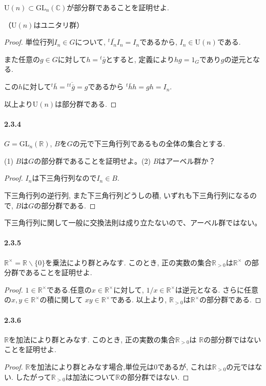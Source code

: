 $\mathrm{U}(n) \subset \mathrm{GL}_n(\mathbb{C})$が部分群であることを証明せよ.

（$ \mathrm{U}(n)$はユニタリ群）
\begin{proof}
  単位行列$I_n \in G$について, ${}^t\bar{I_n}I_n=I_n$であるから,
  $I_n \in \mathrm{U}(n)$である.

  また任意の$g \in G$に対して$h={}^t\bar{g}$とすると,
  定義により$hg=1_G$であり$g$の逆元となる.

  この$h$に対して${}^t \bar{h}={}^t \overline{{}^t\bar{g}}=g$であるから
  ${}^t \bar{h}h=gh= I_n$.
  
  以上より$ \mathrm{U}(n)$は部分群である.
\end{proof}\leavevmode

\paragraph{2.3.4} 
$G=\mathrm{GL}_n(\mathbb{R})$, $B$を$G$の元で下三角行列であるもの全体の集合とする.

(1) $B$は$G$の部分群であることを証明せよ。(2) $B$はアーベル群か？
\begin{proof}
  $I_n$は下三角行列なので$I_n \in B$.
  
  下三角行列の逆行列, また下三角行列どうしの積,
  いずれも下三角行列になるので, $B$は$G$の部分群である.
\end{proof}

下三角行列に関して一般に交換法則は成り立たないので、アーベル群ではない。\newline

\paragraph{2.3.5}
$\mathbb{R}^\times = \mathbb{R}\backslash\{0\}$を乗法により群とみなす.
このとき, 正の実数の集合$\mathbb{R}_{>0}$は$\mathbb{R}^\times$
の部分群であることを証明せよ.
\begin{proof}
  $1 \in \mathbb{R}^\times$である.任意の$x \in \mathbb{R}^\times$に対して,
  $1/x \in \mathbb{R}^\times$は逆元となる. 
  さらに任意の$x,y \in \mathbb{R}^\times$の積に関して
  $xy \in \mathbb{R}^\times$である.
  以上より, $\mathbb{R}_{>0}$は$\mathbb{R}^\times$の部分群である.
\end{proof}\leavevmode

\paragraph{2.3.6}
$\mathbb{R}$を加法により群とみなす.
このとき, 正の実数の集合$\mathbb{R}_{>0}$は
$\mathbb{R}$の部分群ではないことを証明せよ.
\begin{proof}
  $\mathbb{R}$を加法により群とみなす場合,単位元は0であるが,
  これは$\mathbb{R}_{>0}$の元ではない.
  したがって$\mathbb{R}_{>0}$は加法について$\mathbb{R}$の部分群ではない.
\end{proof}\leavevmode

